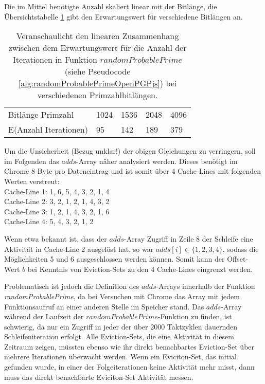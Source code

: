 Die im Mittel benötigte Anzahl skaliert linear mit der Bitlänge, die Übersichtstabelle \ref{tbl:bitLengthNumberOfIterations} gibt den Erwartungswert für verschiedene Bitlängen an.

\begin{table}[h]
\caption{Veranschaulicht den linearen Zusammenhang zwischen dem Erwartungswert für die Anzahl der Iterationen in Funktion $randomProbablePrime$ (siehe Pseudocode \ref{alg:randomProbablePrimeOpenPGPjs}) bei verschiedenen Primzahlbitlängen.}
\label{tbl:bitLengthNumberOfIterations}
\begin{tabular}{lllll}
Bitlänge Primzahl     & 1024 & 1536 & 2048 & 4096 \\
E(Anzahl Iterationen) & 95   & 142  & 189  & 379 
\end{tabular}
\end{table}

Um die Unsicherheit (Bezug unklar!) der obigen Gleichungen zu verringern, soll im Folgenden das $adds$-Array näher analysiert werden.
Dieses benötigt im Chrome 8 Byte pro Dateneintrag und ist somit über 4 Cache-Lines mit folgenden Werten verstreut:\\
Cache-Line 1: 1, 6, 5, 4, 3, 2, 1, 4\\
Cache-Line 2: 3, 2, 1, 2, 1, 4, 3, 2\\
Cache-Line 3: 1, 2, 1, 4, 3, 2, 1, 6\\
Cache-Line 4: 5, 4, 3, 2, 1, 2

Wenn etwa bekannt ist, dass der $adds$-Array Zugriff in Zeile 8 der Schleife eine Aktivität in Cache-Line 2 ausgelöst hat, so war $adds[i] \in \{1,2,3,4\}$, sodass die Möglichkeiten 5 und 6 ausgeschlossen werden können.
Somit kann der Offset-Wert $b$ bei Kenntnis von Eviction-Sets zu den 4 Cache-Lines eingrenzt werden.

Problematisch ist jedoch die Definition des $adds$-Arrays innerhalb der Funktion \textit{randomProbablePrime}, da bei Versuchen mit Chrome das Array mit jedem Funktionsaufruf an einer anderen Stelle im Speicher stand.
Das $adds$-Array während der Laufzeit der $randomProbablePrime$-Funktion zu finden, ist schwierig, da nur ein Zugriff in jeder der über 2000 Taktzyklen dauernden Schleifeniteration erfolgt.
Alle Eviction-Sets, die eine Aktivität in diesem Zeitraum zeigen, müssten ebenso wie ihr direkt benachbartes Eviction-Set über mehrere Iterationen überwacht werden.
Wenn ein Eviciton-Set, das initial gefunden wurde, in einer der Folgeiterationen keine Aktivität mehr misst, dann muss das direkt benachbarte Eviciton-Set Aktivität messen.

